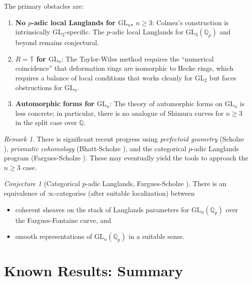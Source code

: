 \documentclass[12pt,a4paper]{amsart}
\theoremstyle{definition}
\theoremstyle{remark}
\newtheorem{remark}[theorem]{Remark}
\newtheorem{conjecture}[theorem]{Conjecture}
\newcommand{\GL}{\mathrm{GL}}
\newcommand{\Qp}{\mathbb{Q}_p}
\newcommand{\Q}{\mathbb{Q}}
\begin{document}
The primary obstacles are:
\begin{enumerate}[label=(\roman*)]
  \item \textbf{No $p$-adic local Langlands for $\GL_n$, $n \geq 3$}: Colmez's
    construction is intrinsically $\GL_2$-specific. The $p$-adic local Langlands for
    $\GL_3(\Qp)$ and beyond remains conjectural.
  \item \textbf{$R = \mathbb{T}$ for $\GL_n$}: The Taylor-Wiles method requires the
    ``numerical coincidence'' that deformation rings are isomorphic to Hecke rings, which
    requires a balance of local conditions that works cleanly for $\GL_2$ but faces
    obstructions for $\GL_n$.
  \item \textbf{Automorphic forms for $\GL_n$}: The theory of automorphic forms on
    $\GL_n$ is less concrete; in particular, there is no analogue of Shimura curves for
    $n \geq 3$ in the split case over $\Q$.
\end{enumerate}

\begin{remark}
  There is significant recent progress using \emph{perfectoid geometry} (Scholze
  \cite{Scholze2015}), \emph{prismatic cohomology} (Bhatt-Scholze \cite{BS2022}), and
  the categorical $p$-adic Langlands program (Fargues-Scholze \cite{FS2021}).
  These may eventually yield the tools to approach the $n \geq 3$ case.
\end{remark}

\begin{conjecture}[Categorical $p$-adic Langlands, Fargues-Scholze \cite{FS2021}]
  There is an equivalence of $\infty$-categories (after suitable localization) between
  \begin{itemize}
    \item coherent sheaves on the stack of Langlands parameters for $\GL_n(\Qp)$ over the
      Fargues-Fontaine curve, and
    \item smooth representations of $\GL_n(\Qp)$ in a suitable sense.
  \end{itemize}
\end{conjecture}

\section{Known Results: Summary}
\end{document}
